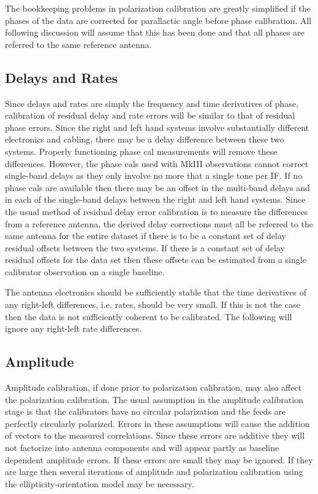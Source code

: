    The bookkeeping problems in polarization calibration are greatly
simplified if the phases of the data are corrected for parallactic
angle before phase calibration. All following discussion will assume
that this has been done and that all phases are referred to the same
reference antenna.

\subsection {Delays and Rates}

   Since delays and rates are simply the frequency and time
derivatives of phase, calibration of residual delay and rate errors
will be similar to that of residual phase errors.  Since the right and
left hand systems involve substantially different electronics and
cabling, there may be  a delay difference between these two systems.
Properly functioning phase cal measurements will remove these
differences.  However, the phase cals used with MkIII observations
cannot correct single-band delays as they only involve no more that a
single tone per IF.  If no phase cals are available then there may be
an offset in the multi-band delays and in  each of the single-band
delays between the right and left hand systems.
Since the usual method of residual delay error
calibration is to measure the differences from a reference antenna,
the derived delay corrections must all be referred to the same
antenna for the entire  dataset if there is to be a constant set of
delay residual offsets between the two systems.  If there is a
constant set of delay residual offsets for the data set then these
offsets can be estimated from a single calibrator observation on a
single baseline.

   The antenna electronics should be sufficiently stable that the time
derivatives of any right-left differences, i.e. rates, should be very
small.  If this is not the case then the data is not sufficiently
coherent to be calibrated.  The following will ignore any right-left
rate differences.

\subsection {Amplitude}

   Amplitude calibration, if done prior to polarization calibration,
may also affect the polarization calibration.  The usual assumption in
the amplitude calibration stage is that the calibrators have no
circular polarization and the feeds are perfectly circularly
polarized.  Errors in these assumptions will cause the addition of
vectors to the measured correlations.  Since these errors are additive
they will not factorize into antenna components and will appear partly
as baseline dependent amplitude errors.  If these errors are small
they may be ignored.  If they are large then several iterations of
amplitude and polarization calibration using the
ellipticity-orientation model may be necessary.
\vfil\eject


